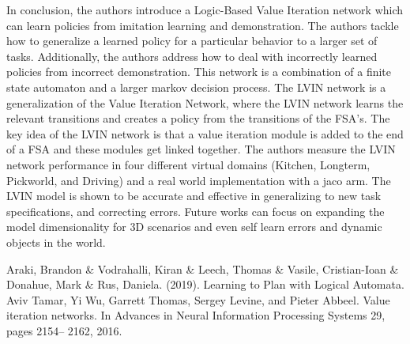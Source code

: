 \documentclass[letterpaper, 10 pt, conference]{ieeeconf}  %
\begin{document}
In conclusion, the authors introduce a Logic-Based Value Iteration network which can learn policies from imitation learning and demonstration. The authors tackle how to generalize a learned policy for a particular behavior to a larger set of tasks. Additionally, the authors address how to deal with incorrectly learned policies from incorrect demonstration. This network is a combination of a finite state automaton and a larger markov decision process. The LVIN network is a generalization of the Value Iteration Network, where the LVIN network learns the relevant transitions and creates a policy from the transitions of the FSA's. The key idea of the LVIN network is that a value iteration module is added to the end of a FSA and these modules get linked together. 
\newline
\indent The authors measure the LVIN network performance in four different virtual domains (Kitchen, Longterm, Pickworld, and Driving) and a real world implementation with a jaco arm. The LVIN model is shown to be accurate and effective in generalizing to new task specifications, and correcting errors. Future works can focus on expanding the model dimensionality for 3D scenarios and even self learn errors and dynamic objects in the world.

\addtolength{\textheight}{-12cm}   %








\begin{thebibliography}{99}

 Araki, Brandon \& Vodrahalli, Kiran \& Leech, Thomas \& Vasile, Cristian-Ioan \& Donahue, Mark \& Rus, Daniela. (2019). Learning to Plan with Logical Automata.
 Aviv Tamar, Yi Wu, Garrett Thomas, Sergey Levine, and Pieter Abbeel. Value iteration networks. In Advances in Neural Information Processing Systems 29, pages 2154– 2162, 2016.


\end{thebibliography}
\end{document}
